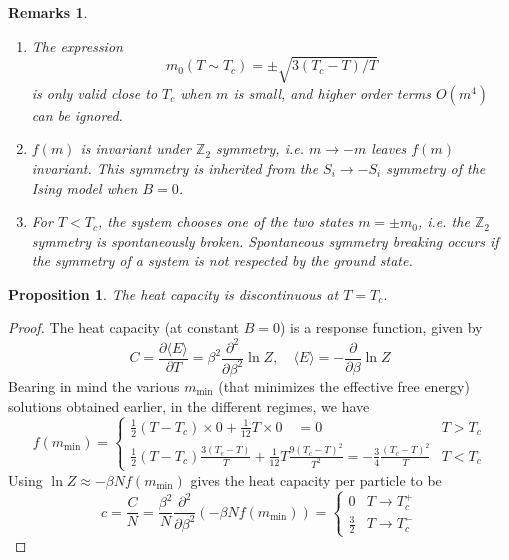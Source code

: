 \documentclass[a4paper]{article}
\newtheorem{remarks}{Remarks}[section]
\theoremstyle{new}
\newtheorem{prop}{Proposition}[section]
\begin{document}
\begin{remarks}\leavevmode
\begin{enumerate}
    \item The expression 
$$m_0(T\sim T_c)=\pm\sqrt{3(T_c-T)/T}$$
is only valid close to $T_c$ when $m$ is small, and higher order terms $O(m^4)$ can be ignored.
    \item $f(m)$ is invariant under $\mathbb{Z}_2$ symmetry, i.e. $m\rightarrow -m$ leaves $f(m)$ invariant. This symmetry is inherited from the $S_i\rightarrow-S_i$ symmetry of the Ising model when $B=0$.
    \item For $T<T_c$, the system chooses one of the two states $m=\pm m_0$, i.e. the $\mathbb{Z}_2$ symmetry is spontaneously broken. Spontaneous symmetry breaking occurs if the symmetry of a system is not respected by the ground state.
\end{enumerate}
\end{remarks}
\begin{prop}
The heat capacity is discontinuous at $T=T_c$.
\end{prop}
\begin{proof}
The heat capacity (at constant $B=0$) is a response function, given by
$$C=\frac{\partial\langle E\rangle}{\partial T}=\beta^2\frac{\partial^2}{\partial\beta^2}\ln Z,\quad\langle E\rangle=-\frac{\partial}{\partial\beta}\ln Z$$
Bearing in mind the various $m_{\text{min}}$ (that minimizes the effective free energy) solutions obtained earlier, in the different regimes, we have 
$$f(m_{\text{min}})=
\left\{
        \begin{array}{ll}
      \frac{1}{2}(T-T_c)\times 0+\frac{1}{12}T\times 0\quad=0 & T>T_c \\
      \frac{1}{2}(T-T_c)\frac{3(T_c-T)}{T}+\frac{1}{12}T\frac{9(T_c-T)^2}{T^2}=-\frac{3}{4}\frac{(T_c-T)^2}{T} & T<T_c
      \end{array}
    \right.$$
Using $\ln Z\approx-\beta N f(m_{\text{min}})$ gives the heat capacity per particle to be
$$c=\frac{C}{N}=\frac{\beta^2}{N}\frac{\partial^2}{\partial\beta^2}(-\beta N f(m_{\text{min}}))=
\left\{
        \begin{array}{ll}
      0 & T\rightarrow T_c^+ \\
      \frac{3}{2} & T\rightarrow T_c^-
        \end{array}
    \right.$$
\end{proof}
\end{document}

